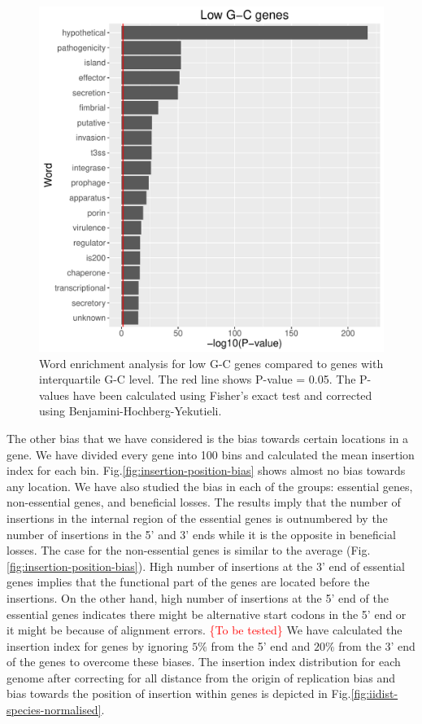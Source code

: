 \documentclass[12pt,letterpaper]{article}
\begin{document}
\begin{figure}
\includegraphics[scale=0.55]{lowgc-pval.pdf}
\caption{Word enrichment analysis for low G-C genes compared to genes with interquartile G-C level. The red line shows P-value = 0.05. The P-values have been calculated using Fisher's exact test and corrected using Benjamini-Hochberg-Yekutieli.}
\label{fig:gc-pval}
\end{figure}

The other bias that we have considered is the bias towards certain locations in a gene. We have divided every gene into 100 bins and calculated the mean insertion index for each bin. Fig.\@ \ref{fig:insertion-position-bias} shows almost no bias towards any location. We have also studied the bias in each of the groups: essential genes, non-essential genes, and beneficial losses. The results imply that the number of insertions in the internal region of the essential genes is outnumbered by the number of insertions in the 5' and 3' ends while it is the opposite in beneficial losses. The case for the non-essential genes is similar to the average (Fig.\@ \ref{fig:insertion-position-bias}). High number of insertions at the 3' end of essential genes implies that the functional part of the genes are located before the insertions. On the other hand, high number of insertions at the 5' end of the essential genes indicates there might be alternative start codons in the 5' end or it might be because of alignment errors. \textcolor{red}{\{To be tested\}} We have calculated the insertion index for genes by ignoring $5\%$ from the 5' end and $20\%$ from the 3' end of the genes to overcome these biases. The insertion index distribution for each genome after correcting for all distance from the origin of replication bias and bias towards the position of insertion within genes is depicted in Fig.\@ \ref{fig:iidist-species-normalised}.
\end{document}
